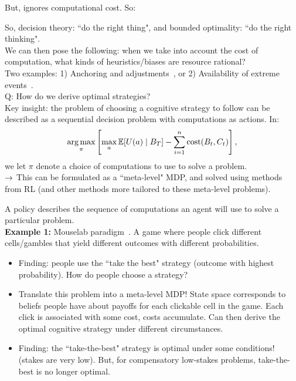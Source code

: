 

But, ignores computational cost. So:
\newpage
{}

So, decision theory: ``do the right thing", and bounded optimality: ``do the right thinking". \\

We can then pose the following: when we take into account the cost of computation, what kinds of heuristics/biases are resource rational? \\

Two examples: 1) Anchoring and adjustments~\cite{lieder2012burn}, or 2) Availability of extreme events~\cite{lieder2018overrepresentation}. \\

Q: How do we derive optimal strategies? \\

Key insight: the problem of choosing a cognitive strategy to follow can be described as a sequential decision problem with computations as actions. In:
\[
\operatorname*{arg\,max}_\pi \left[\max_a \mathbb{E}[U(a) \mid B_T] - \sum_{i = 1}^n \text{cost}(B_t, C_t)\right],
\]
we let $\pi$ denote a choice of computations to use to solve a problem. \\

$\rightarrow$ This can be formulated as a ``meta-level" MDP, and solved using methods from RL (and other methods more tailored to these meta-level problems). \\


A policy describes the sequence of computations an agent will use to solve a particular problem. \\

{\bf Example 1:} Mouselab paradigm~\cite{payne1993adaptive}. A game where people click different cells/gambles that yield different outcomes with different probabilities.

\begin{itemize}
    \item Finding: people use the ``take the best" strategy (outcome with highest probability). How do people choose a strategy?
    \item Translate this problem into a meta-level MDP! State space corresponds to beliefs people have about payoffs for each clickable cell in the game. Each click is associated with some cost, costs accumulate. Can then derive the optimal cognitive strategy under different circumstances.
    \item Finding: the ``take-the-best" strategy is optimal under some conditions! (stakes are very low). But, for compensatory low-stakes problems, take-the-best is no longer optimal.
\end{itemize}

